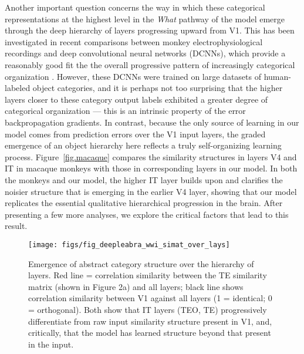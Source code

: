 \documentclass[11pt,twoside]{article}
\newif\myifpdf
\begin{document}
Another important question concerns the way in which these categorical representations at the highest level in the \emph{What} pathway of the model emerge through the deep hierarchy of layers progressing upward from V1.  This has been investigated in recent comparisons between monkey electrophysiological recordings and deep convolutional neural networks (DCNNs), which provide a reasonably good fit the the overall progressive pattern of increasingly categorical organization \citep{CadieuHongYaminsEtAl14}.  However, these DCNNs were trained on large datasets of human-labeled object categories, and it is perhaps not too surprising that the higher layers closer to these category output labels exhibited a greater degree of categorical organization --- this is an intrinsic property of the error backpropagation gradients.  In contrast, because the only source of learning in our model comes from prediction errors over the V1 input layers, the graded emergence of an object hierarchy here reflects a truly self-organizing learning process.  Figure~\ref{fig.macaque} compares the similarity structures in layers V4 and IT in macaque monkeys \citep{CadieuHongYaminsEtAl14} with those in corresponding layers in our model.  In both the monkeys and our model, the higher IT layer builds upon and clarifies the noisier structure that is emerging in the earlier V4 layer, showing that our model replicates the essential qualitative hierarchical progression in the brain.  After presenting a few more analyses, we explore the critical factors that lead to this result.

\begin{figure}
  \centering\texttt{[image: figs/fig\_deepleabra\_wwi\_simat\_over\_lays]}
  \caption{Emergence of abstract category structure over the hierarchy of layers.  Red line = correlation similarity between the TE similarity matrix (shown in Figure 2a) and all layers; black line shows correlation similarity between V1 against all layers (1 = identical; 0 = orthogonal). Both show that IT layers (TEO, TE) progressively differentiate from raw input similarity structure present in V1, and, critically, that the model has learned structure beyond that present in the input.}
  \label{fig.simat-lays}
\end{figure}
\end{document}
